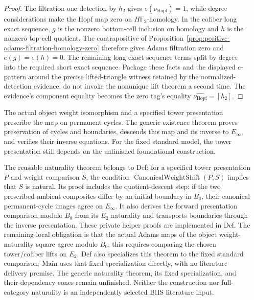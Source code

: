 \begin{proof}
  The filtration-one detection by $h_2$ gives
  $e(\nu_{\mathrm{Hopf}})=1$, while degree considerations make the Hopf map
  zero on $H\mathbb F_2$-homology.  In the cofiber long exact sequence, $g$
  is the nonzero bottom-cell inclusion on homology and $h$ is the nonzero
  top-cell quotient.  The contrapositive of
  Proposition~\ref{prop:positive-adams-filtration-homology-zero} therefore
  gives Adams filtration zero and $e(g)=e(h)=0$.  The remaining
  long-exact-sequence terms split by degree into
  the required short exact sequence.  Package these facts and the displayed
  $e$-pattern around the precise lifted-triangle witness retained by the
  normalized-detection evidence; do not invoke the nonunique lift theorem a
  second time.  The evidence's component equality becomes the zero tag's
  equality $\widehat{\nu_{\mathrm{Hopf}}}=[h_2]$.
\end{proof}
\begin{theorem}
  \label{thm:main-weight-shift-naturality}
  \notready
  The actual object weight isomorphism and a specified tower presentation
  prescribe the map on permanent cycles. The generic existence theorem
  proves preservation of cycles and boundaries, descends this map and
  its inverse to $E_\infty$, and verifies their inverse equations.
  For the fixed standard model, the tower presentation still depends on
  the unfinished foundational construction.

  The reusable naturality theorem belongs to Def: for a specified tower
  presentation $P$ and weight comparison $S$, the condition
  $\operatorname{CanonicalWeightShift}(P,S)$ implies that $S$ is natural.
  Its proof includes the quotient-descent step: if the two prescribed ambient
  composites differ by an initial boundary in $B_0$, their canonical
  permanent-cycle images agree on $E_\infty$. It also derives the forward
  presentation comparison modulo $B_0$ from its $E_2$ naturality and
  transports boundaries through the inverse presentation. These private
  helper proofs are implemented in Def. The remaining local obligation is that
  the actual Adams maps of the object weight-naturality square agree
  modulo $B_0$; this requires comparing the chosen tower/cofiber lifts
  on $E_2$. Def also specializes this theorem to the fixed standard comparison;
  Main uses that fixed specialization directly, with no literature-delivery
  premise. The generic
  naturality theorem, its fixed specialization, and their dependency cones
  remain unfinished. Neither the construction nor
  full-category naturality is an independently selected BHS literature input.
\end{theorem}

